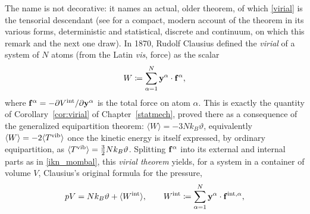 \begin{remark}\label{rem:virialname}
	The name is not decorative: it names an actual, older theorem, of which \eqref{virial} is the tensorial descendant (see \cite{PodioGuidugli2019} for a compact, modern account of the theorem in its various forms, deterministic and statistical, discrete and continuum, on which this remark and the next one draw). In 1870, Rudolf Clausius defined the \textit{virial} of a system of $N$ atoms (from the Latin \textit{vis}, force) as the scalar
	\begin{equation}
		W \coloneqq \sum_{\alpha=1}^N \mathbf{y}^\alpha\cdot\mathbf{f}^\alpha,
	\end{equation}
	where $\mathbf{f}^\alpha=-\partial V^{\rm int}/\partial\mathbf{y}^\alpha$ is the total force on atom $\alpha$. This is exactly the quantity of Corollary~\ref{cor:virial} of Chapter~\ref{statmech}, proved there as a consequence of the generalized equipartition theorem: $\langle W\rangle=-3Nk_B\vartheta$, equivalently $\langle W\rangle=-2\langle T^{\rm vib}\rangle$ once the kinetic energy is itself expressed, by ordinary equipartition, as $\langle T^{\rm vib}\rangle=\tfrac32Nk_B\vartheta$. Splitting $\mathbf{f}^\alpha$ into its external and internal parts as in \eqref{ikn_mombal}, this \textit{virial theorem} yields, for a system in a container of volume $V$, Clausius's original formula for the pressure,
	\begin{equation}\label{clausiuspressure}
		pV = Nk_B\vartheta + \langle W^{\rm int}\rangle, \qquad W^{\rm int}\coloneqq\sum_{\alpha=1}^N \mathbf{y}^\alpha\cdot\mathbf{f}^{{\rm int},\alpha},
	\end{equation}

\end{remark}
